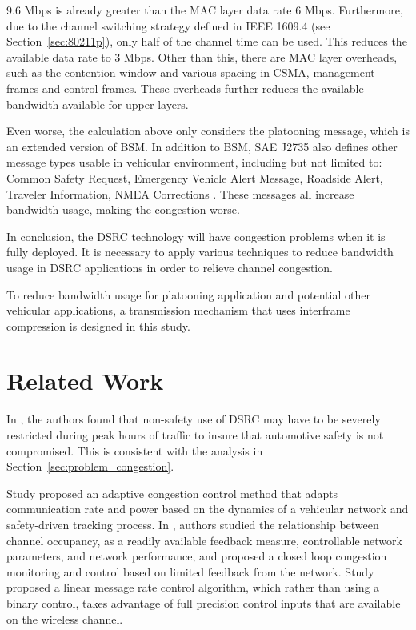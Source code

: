 \documentclass[12pt]{report}
\begin{document}
9.6 Mbps is already greater than the MAC layer data rate 6 Mbps. Furthermore, due to the channel switching strategy defined in IEEE 1609.4 (see Section~\ref{sec:80211p}), only half of the channel time can be used. This reduces the available data rate to 3 Mbps. Other than this, there are MAC layer overheads, such as the contention window and various spacing in CSMA, management frames and control frames. These overheads further reduces the available bandwidth available for upper layers.

Even worse, the calculation above only considers the platooning message, which is an extended version of BSM. In addition to BSM, SAE J2735 also defines other message types usable in vehicular environment, including but not limited to: Common Safety Request, Emergency Vehicle Alert Message, Roadside Alert, Traveler Information, NMEA Corrections \cite{sae2016j2735,kenney2011}. These messages all increase bandwidth usage, making the congestion worse.

In conclusion, the DSRC technology will have congestion problems when it is fully deployed. It is necessary to apply various techniques to reduce bandwidth usage in DSRC applications in order to relieve channel congestion.

To reduce bandwidth usage for platooning application and potential other vehicular applications, a transmission mechanism that uses interframe compression is designed in this study.

\section{Related Work}

In \cite{Wang2008howmuch}, the authors found that non-safety use of DSRC may have to be severely restricted during peak hours of traffic to insure that automotive safety is not compromised. This is consistent with the analysis in Section~\ref{sec:problem_congestion}.

Study \cite{huang2010adaptive} proposed an adaptive congestion control method that adapts communication rate and power based on the dynamics of a vehicular network and safety-driven tracking process. In \cite{fallah2010occupancy}, authors studied the relationship between channel occupancy, as a readily available feedback measure, controllable network parameters, and network performance, and proposed a closed loop congestion monitoring and control based on limited feedback from the network. Study \cite{Kenney2011linear} proposed a linear message rate control algorithm, which rather than using a binary control, takes advantage of full precision control inputs that are available on the wireless channel.
\end{document}
